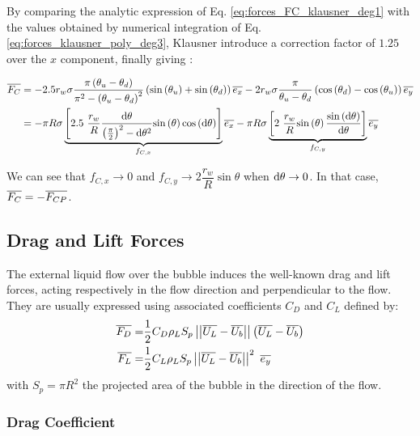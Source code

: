 By comparing the analytic expression of Eq. \ref{eq:forces_FC_klausner_deg1} with the values obtained by numerical integration of Eq.\ref{eq:forces_klausner_poly_deg3}, Klausner \etal introduce a correction factor of $1.25$ over the $x$ component, finally giving :

\begin{align}
\vect{F_{C}}&=-2.5r_{w}\sigma \frac{\pi\parth{\theta_{u}-\theta_{d}}}{\pi^{2}-\parth{\theta_{u}-\theta_{d}}^{2}}\parth{\sin{\theta_{u}}+\sin{\theta_{d}} }\vect{e_{x}} - 2r_{w} \sigma \frac{\pi}{\theta_{u}-\theta_{d}}\parth{\cos{\theta_{d}}- \cos{\theta_{u}}}\vect{e_{y}}\\
%
&=-\pi R \sigma \underbrace{\crocht{2.5~ \frac{r_{w}}{R} \frac{\dtheta}{\parth{\frac{\pi}{2}}^{2}-\dtheta^{2}}\sin{\theta}\cos{\dtheta}}}_{f_{C,x}} \vect{e_{x}} - \pi R \sigma \underbrace{\crocht{2\ \frac{r_{w}}{R} \sin{\theta} \frac{\sin{\dtheta}}{\dtheta}}}_{f_{C,y}} \vect{e_{y}}
\label{eq:forces_FC}
\end{align}

\begin{remark*}{}
We can see that $f_{C,x} \to 0$ and $f_{C,y} \to 2\dfrac{r_{w}}{R}\sin{\theta}$  when $\mathrm{d}\theta \to 0$. In that case, $\overline{F_{C}} = -\overline{F_{CP}}$.
\end{remark*}





\subsection{Drag and Lift Forces}


The external liquid flow over the bubble induces the well-known drag and lift forces, acting respectively in the flow direction and perpendicular to the flow. They are usually expressed using associated coefficients $C_{D}$ and $C_{L}$ defined by:
\begin{align}
\overline{F_{D}}=&\frac{1}{2}C_{D}\rho_{L}S_{p} \left|\left|{ \overline{U_{L}}-\overline{U_{b}} }\right|\right| \left( \overline{U_{L}}-\overline{U_{b}} \right) \\
\overline{F_{L}}=&\frac{1}{2}C_{L}\rho_{L}S_{p}\left|\left|{\overline{U_{L}}-\overline{U_{b}}}\right|\right|^{2}\ \overline{e_{y}}
\end{align}
with $S_{p}=\pi R^{2}$ the projected area of the bubble in the direction of the flow.

\subsubsection{Drag Coefficient}

